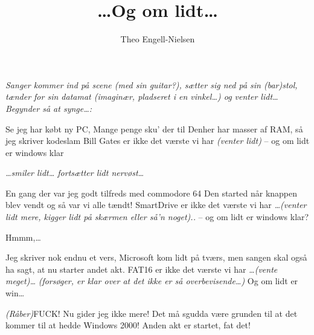 \documentclass[danish,11pt]{article}
\title{\ldots{}Og om lidt\ldots}
\author{Theo Engell-Nielsen}
\begin{document}
\maketitle

\begin{song}
{\em Sanger kommer ind på scene (med sin guitar?), sætter sig ned på sin
  (bar)stol, tænder for sin datamat (imaginær, pladseret %
 i en vinkel\ldots) og venter lidt\ldots Begynder så at synge\ldots:}

 Se jeg har købt ny PC,
Mange penge sku' der til
Denher har masser af RAM,
så jeg skriver kodeslam
Bill Gates er ikke det værste vi har
{\em (venter lidt)}
-- og om lidt er windows klar

{\em \ldots{}smiler lidt\ldots{} fortsætter lidt nervøst\ldots} 

 En gang der var jeg godt tilfreds
med commodore 64
Den started når knappen blev vendt
og så var vi alle tændt!
SmartDrive er ikke det værste vi har
{\em \ldots{}(venter lidt mere, kigger lidt på skærmen eller så'n noget)..}
-- og om lidt er windows klar?

\vspace{1cm}

 Hmmm,\ldots
 
\vspace{1cm}

 Jeg skriver nok endnu et vers,
Microsoft kom lidt på tværs,
men sangen skal også ha sagt,
at nu starter andet akt.
FAT16 er ikke det værste vi har
{\em \ldots{}(vente meget)\ldots}
{\em(forsøger, er klar over at det ikke er så overbevisende\ldots)}
Og om lidt er win\ldots

{\em (Råber)}FUCK! Nu gider jeg ikke mere! Det må sgudda være grunden til at det 
kommer til at hedde Windows 2000! Anden akt er startet, fat det!
\end{song}
\end{document}
